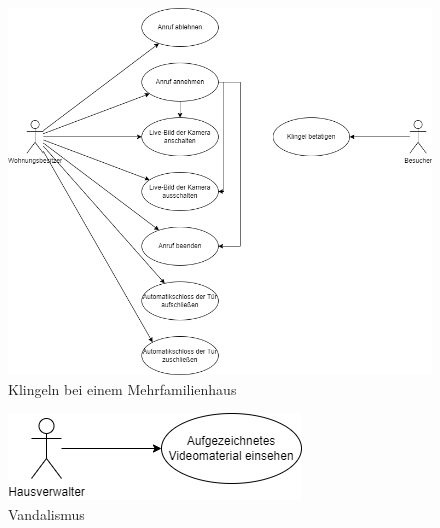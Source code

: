 \begin{figure}[ht!]
    \includegraphics[width=\paperwidth-2in]{../assets/img/UML-Anwendungsfalldiagramme-Klingeln bei einem Mehrfamilienhaus}
    \caption{Klingeln bei einem Mehrfamilienhaus}
    \label{fig:klingeln-bei-einem-mehrfamilienhaus}
\end{figure}

\begin{figure}[ht!]
    \includegraphics[width=\paperwidth-2in]{../assets/img/UML-Anwendungsfalldiagramme-Vandalismus.drawio}
    \caption{Vandalismus}
    \label{fig:vandalismus}
\end{figure}

